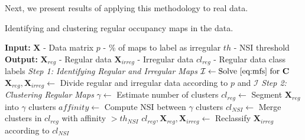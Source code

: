 Next, we present results of applying this methodology to real data.
%
\begin{algorithm}
\caption{Identifying and clustering regular occupancy maps in the data.}
\label{alg:method}
\begin{algorithmic}[1]
\Statex \textbf{Input:} $\mathbf{X}$ - Data matrix
\Statex \qquad\quad $p$ - \% of maps to label as irregular
\Statex \qquad\quad $th$ - NSI threshold
\Statex \textbf{Output:} $\mathbf{X}_{reg}$ - Regular data
\Statex \qquad\quad\quad\!$\mathbf{X}_{irreg}$ - Irregular data
\Statex \qquad\quad\quad\!\!$cl_{reg}$ - Regular data class labels
\Statex
\Statex \emph{Step 1: Identifying Regular and Irregular Maps}
\State $\mathcal{I} \gets \text{Solve \eqref{eq:mfs} for } \mathbf{C}$
\State $\mathbf{X}_{reg}, \mathbf{X}_{irreg} \gets $ Divide regular and irregular data 
\Statex \hspace{23.3mm} according to $p$ and $\mathcal{I}$
\Statex
\Statex \emph{Step 2: Clustering Regular Maps}
\State $\gamma \gets$ Estimate number of clusters
\State $cl_{reg} \gets $ Segment $\mathbf{X}_{reg}$ into $\gamma$ clusters \label{lin:segm}
\State $affinity \gets $ Compute NSI between $\gamma$ clusters
\State $cl_{NSI} \gets $ Merge clusters in $cl_{reg}$ with affinity $> th_{NSI}$
\State $cl_{reg},\mathbf{X}_{reg},\mathbf{X}_{irreg}\gets $ Reclassify $\mathbf{X}_{irreg}$ according 
\Statex \hspace{33mm}to $cl_{NSI}$
\end{algorithmic}
\end{algorithm}
